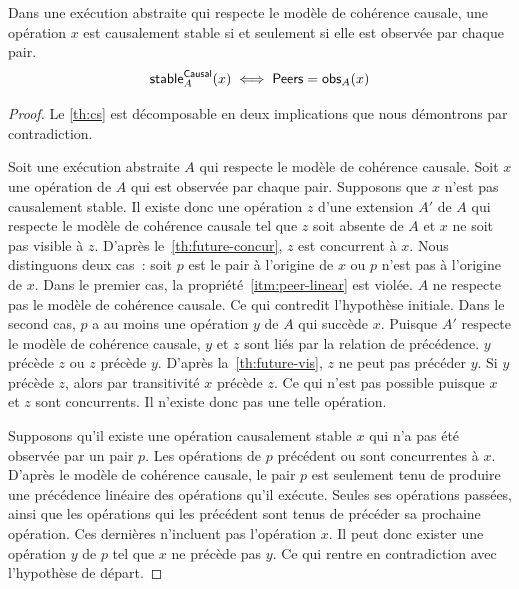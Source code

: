 \begin{theorem}\label{th:cs}
Dans une exécution abstraite qui respecte le modèle de cohérence causale, une opération $x$ est causalement stable si et seulement si elle est observée par chaque pair.
\begin{equation*}
    \operatorname{\mathsf{stable}}_A^{\operatorname{\mathsf{Causal}}}(x) \iff \operatorname{\mathsf{Peers}} = \operatorname{\mathsf{obs}}_A(x)
\end{equation*}
\end{theorem}

\begin{proof}
Le \autoref{th:cs} est décomposable en deux implications que nous démontrons par contradiction.

Soit une exécution abstraite $A$ qui respecte le modèle de cohérence causale.
Soit $x$ une opération de $A$ qui est observée par chaque pair.
Supposons que $x$ n'est pas causalement stable.
Il existe donc une opération $z$ d'une extension $A'$ de $A$ qui respecte le modèle de cohérence causale tel que $z$ soit absente de $A$ et $x$ ne soit pas visible à $z$.
D'après le~\autoref{th:future-concur}, $z$ est concurrent à $x$.
Nous distinguons deux cas~: soit $p$ est le pair à l'origine de $x$ ou $p$ n'est pas à l'origine de $x$.
Dans le premier cas, la propriété~\ref{itm:peer-linear} est violée.
$A$ ne respecte pas le modèle de cohérence causale.
Ce qui contredit l'hypothèse initiale.
Dans le second cas, $p$ a au moins une opération $y$ de $A$ qui succède $x$.
Puisque $A'$ respecte le modèle de cohérence causale, $y$ et $z$ sont liés par la relation de précédence.
$y$ précède $z$ ou $z$ précède $y$.
D'après la~\autoref{th:future-vis}, $z$ ne peut pas précéder $y$.
Si $y$ précède $z$, alors par transitivité $x$ précède $z$.
Ce qui n'est pas possible puisque $x$ et $z$ sont concurrents.
Il n'existe donc pas une telle opération.

Supposons qu'il existe une opération causalement stable $x$ qui n'a pas été observée par un pair $p$.
Les opérations de $p$ précédent ou sont concurrentes à $x$.
D'après le modèle de cohérence causale, le pair $p$ est seulement tenu de produire une précédence linéaire des opérations qu'il exécute.
Seules ses opérations passées, ainsi que les opérations qui les précédent sont tenus de précéder sa prochaine opération.
Ces dernières n'incluent pas l'opération $x$.
Il peut donc exister une opération $y$ de $p$ tel que $x$ ne précède pas $y$.
Ce qui rentre en contradiction avec l'hypothèse de départ.
\end{proof}


